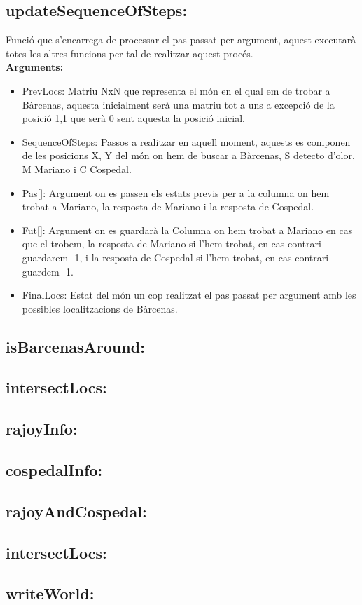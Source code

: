 \documentclass[11pt]{article}
\begin{document}
\subsection{updateSequenceOfSteps:}
Funció que s'encarrega de processar el pas passat per argument, aquest executarà totes les altres funcions per tal de realitzar aquest procés.\\
\textbf{Arguments:}
\begin{itemize}
\item PrevLocs: Matriu NxN que representa el món en el qual em de trobar a Bàrcenas, aquesta inicialment serà una matriu tot a uns a excepció de la posició 1,1 que serà 0 sent aquesta la posició inicial.
\item SequenceOfSteps: Passos a realitzar en aquell moment, aquests es componen de les posicions X, Y del món on hem de buscar a Bàrcenas, S detecto d'olor, M Mariano i C Cospedal.
\item Pas[]: Argument on es passen els estats previs per a la columna on hem trobat a Mariano, la resposta de Mariano i la resposta de Cospedal.
\item Fut[]: Argument on es guardarà la Columna on hem trobat a Mariano en cas que el trobem, la resposta de Mariano si l'hem trobat, en cas contrari guardarem -1, i la resposta de Cospedal si l'hem trobat, en cas contrari guardem -1.
\item FinalLocs: Estat del món un cop realitzat el pas passat per argument amb les possibles localitzacions de Bàrcenas.
\end{itemize}
\subsection{isBarcenasAround:}
\subsection{intersectLocs:}
\subsection{rajoyInfo:}
\subsection{cospedalInfo:}
\subsection{rajoyAndCospedal:}
\subsection{intersectLocs:}
\subsection{writeWorld:}
\end{document}
